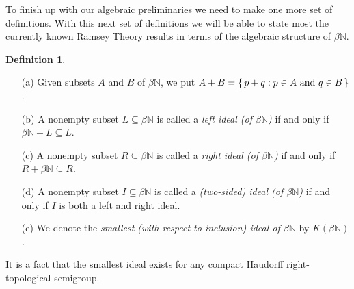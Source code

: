 \documentclass[12pt]{article}
\theoremstyle{plain}
\theoremstyle{definition}
\newtheorem{defn}[thm]{Definition}
\newcommand{\bbN}{\mathbb{N}}
\begin{document}
To finish up with our algebraic preliminaries we need to make one more
set of definitions.
With this next set of definitions we will be able to state most
the currently known Ramsey Theory results in terms of
the algebraic structure of $\beta\bbN$.
  \begin{defn}
    \begin{itemize}
      \item[(a)] Given subsets $A$ and $B$ of $\beta\bbN$, we put $A +
        B = \{\, p+q : \hbox{$p \in A$ and $q \in B$} \,\}$.
      \item[(b)] A nonempty subset $L \subseteq \beta\bbN$ is called a
        \textsl{left ideal (of $\beta\bbN$)} if and only if $\beta\bbN
        + L \subseteq L$.
      \item[(c)] A nonempty subset $R \subseteq \beta\bbN$ is called a
        \textsl{right ideal (of $\beta\bbN$)} if and only if $R +
        \beta\bbN \subseteq R$.
      \item[(d)] A nonempty subset $I \subseteq \beta\bbN$ is called a
        \textsl{(two-sided) ideal (of $\beta\bbN$)} if and only if $I$
        is both a left and right ideal.
      \item[(e)] We denote the \textsl{smallest (with respect to
          inclusion) ideal of $\beta\bbN$} by $K(\beta\bbN)$.
    \end{itemize}
  \end{defn}
It is a fact\cite[Theorem 2.8]{Hindman:1998fk} that the smallest ideal
exists for any compact Haudorff right-topological semigroup. 




\end{document}
